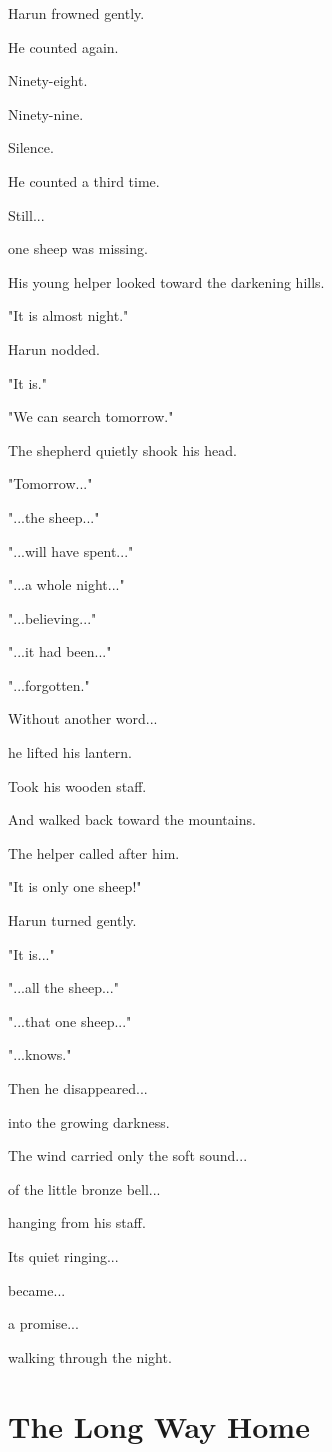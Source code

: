 \documentclass[12pt,openany]{book}
\begin{document}
Harun frowned gently.

He counted again.

Ninety-eight.

Ninety-nine.

Silence.

He counted a third time.

Still...

one sheep was missing.

His young helper looked toward the darkening hills.

"It is almost night."

Harun nodded.

"It is."

"We can search tomorrow."

The shepherd quietly shook his head.

"Tomorrow..."

"...the sheep..."

"...will have spent..."

"...a whole night..."

"...believing..."

"...it had been..."

"...forgotten."

Without another word...

he lifted his lantern.

Took his wooden staff.

And walked back toward the mountains.

The helper called after him.

"It is only one sheep!"

Harun turned gently.

"It is..."

"...all the sheep..."

"...that one sheep..."

"...knows."

Then he disappeared...

into the growing darkness.

The wind carried only the soft sound...

of the little bronze bell...

hanging from his staff.

Its quiet ringing...

became...

a promise...

walking through the night.
\section*{The Long Way Home}
\end{document}
